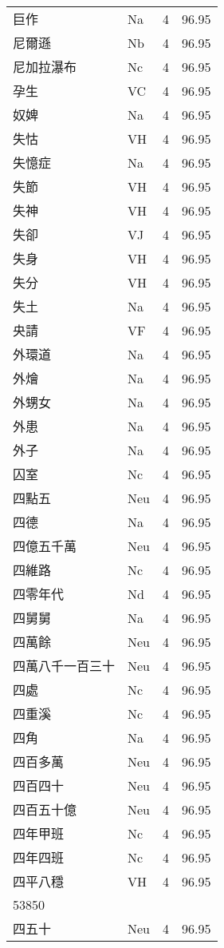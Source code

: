 \documentclass[twocolumn]{book}
\begin{document}
\begin{supertabular}{llrr}
巨作 & Na & 4 &  96.95\\
尼爾遜 & Nb & 4 &  96.95\\
尼加拉瀑布 & Nc & 4 &  96.95\\
孕生 & VC & 4 &  96.95\\
奴婢 & Na & 4 &  96.95\\
失怙 & VH & 4 &  96.95\\
失憶症 & Na & 4 &  96.95\\
失節 & VH & 4 &  96.95\\
失神 & VH & 4 &  96.95\\
失卻 & VJ & 4 &  96.95\\
失身 & VH & 4 &  96.95\\
失分 & VH & 4 &  96.95\\
失土 & Na & 4 &  96.95\\
央請 & VF & 4 &  96.95\\
外環道 & Na & 4 &  96.95\\
外燴 & Na & 4 &  96.95\\
外甥女 & Na & 4 &  96.95\\
外患 & Na & 4 &  96.95\\
外子 & Na & 4 &  96.95\\
囚室 & Nc & 4 &  96.95\\
四點五 & Neu & 4 &  96.95\\
四德 & Na & 4 &  96.95\\
四億五千萬 & Neu & 4 &  96.95\\
四維路 & Nc & 4 &  96.95\\
四零年代 & Nd & 4 &  96.95\\
四舅舅 & Na & 4 &  96.95\\
四萬餘 & Neu & 4 &  96.95\\
四萬八千一百三十 & Neu & 4 &  96.95\\
四處 & Nc & 4 &  96.95\\
四重溪 & Nc & 4 &  96.95\\
四角 & Na & 4 &  96.95\\
四百多萬 & Neu & 4 &  96.95\\
四百四十 & Neu & 4 &  96.95\\
四百五十億 & Neu & 4 &  96.95\\
四年甲班 & Nc & 4 &  96.95\\
四年四班 & Nc & 4 &  96.95\\
四平八穩 & VH & 4 &  96.95\\
53850\\
四五十 & Neu & 4 &  96.95\\

\end{supertabular}
\end{document}
